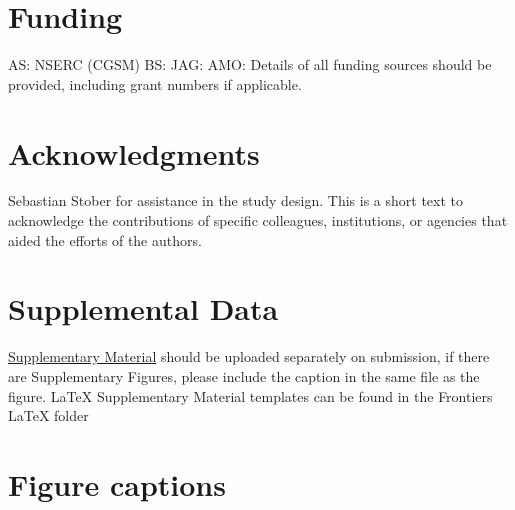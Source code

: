 \documentclass[utf8]{frontiersSCNS} %
\begin{document}
\section*{Funding}
AS: NSERC (CGSM) 
BS:
JAG:
AMO:
Details of all funding sources should be provided, including grant numbers if applicable.

\section*{Acknowledgments}
Sebastian Stober for assistance in the study design.
This is a short text to acknowledge the contributions of specific colleagues, institutions, or agencies that aided the efforts of the authors.

\section*{Supplemental Data}
 \href{http://home.frontiersin.org/about/author-guidelines#SupplementaryMaterial}{Supplementary Material} should be uploaded separately on submission, if there are Supplementary Figures, please include the caption in the same file as the figure. LaTeX Supplementary Material templates can be found in the Frontiers LaTeX folder 





\section*{Figure captions}

\end{document}
